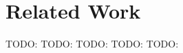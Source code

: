 \section{Related Work}
TODO: \cite{bezirgiannis_improving_2013}
TODO: \cite{di_stefano_using_2005}
TODO: \cite{varela_modelling_2004}
TODO: \cite{sher_agent-based_2013}
TODO: \cite{armstrong_erlang_2010}